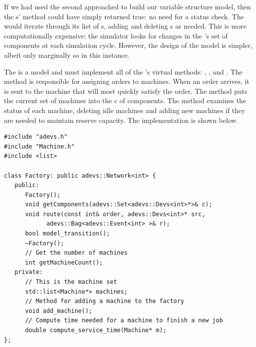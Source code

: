 If we had used the second approached to build our variable structure model, then the s'  method could have simply returned true: no need for a status check. The  would iterate through its list of s, adding and deleting s as needed. This is more computationally expensive: the simulator looks for changes in the 's set of components at each simulation cycle. However, the design of the model is simpler, albeit only marginally so in this instance.

The  is a  model and must implement all of the 's virtual methods: , , and . The  method is responsible for assigning orders to machines. When an order arrives, it is sent to the machine that will most quickly satisfy the order. The  method puts the current set of machines into the  c of components. The  method examines the status of each machine, deleting idle machines and adding new machines if they are needed to maintain reserve capacity. The  implementation is shown below.
\begin{verbatim}
#include "adevs.h"
#include "Machine.h"
#include <list>

class Factory: public adevs::Network<int> {
   public:
      Factory();
      void getComponents(adevs::Set<adevs::Devs<int>*>& c);
      void route(const int& order, adevs::Devs<int>* src,
            adevs::Bag<adevs::Event<int> >& r);
      bool model_transition();
      ~Factory();
      // Get the number of machines
      int getMachineCount();
   private:
      // This is the machine set
      std::list<Machine*> machines;
      // Method for adding a machine to the factory
      void add_machine();
      // Compute time needed for a machine to finish a new job
      double compute_service_time(Machine* m);
};
\end{verbatim}
